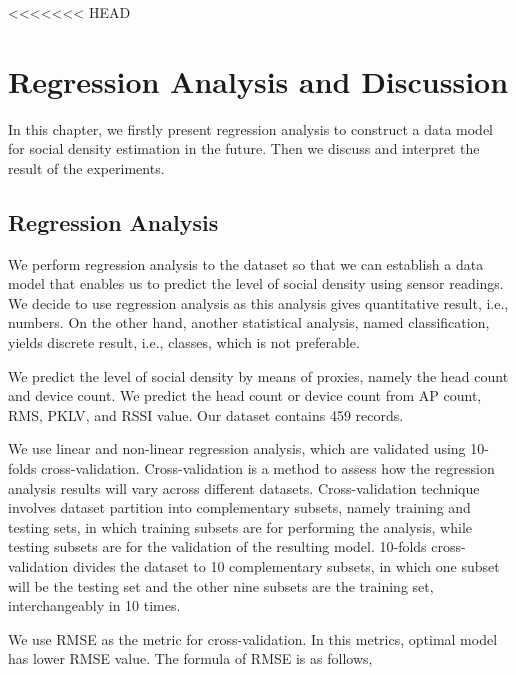 <<<<<<< HEAD
\chapter{Regression Analysis and Discussion}
\label{ch:regression-and-discussion} %
In this chapter, we firstly present regression analysis to construct a data model for social density estimation in the future. Then we discuss and interpret the result of the experiments.

\section{Regression Analysis} %
\label{sec:regression_analysis}
We perform regression analysis to the dataset so that we can establish a data model that enables us to predict the level of social density using sensor readings. We decide to use regression analysis as this analysis gives quantitative result, i.e., numbers. On the other hand, another statistical analysis, named classification, yields discrete result, i.e., classes, which is not preferable.

We predict the level of social density by means of proxies, namely the head count and device count. We predict the head count or device count from \ac{AP} count, \ac{RMS}, \ac{PKLV}, and \ac{RSSI} value. Our dataset contains 459 records.

We use linear and non-linear regression analysis, which are validated using 10-folds cross-validation. Cross-validation is a method to assess how the regression analysis results will vary across different datasets. Cross-validation technique involves dataset partition into complementary subsets, namely training and testing sets, in which training subsets are for performing the analysis, while testing subsets are for the validation of the resulting model. 10-folds cross-validation divides the dataset to 10 complementary subsets, in which one subset will be the testing set and the other nine subsets are the training set, interchangeably in 10 times.

We use \ac{RMSE} as the metric for cross-validation. In this metrics, optimal model has lower \ac{RMSE} value. The formula of \ac{RMSE} is as follows,

